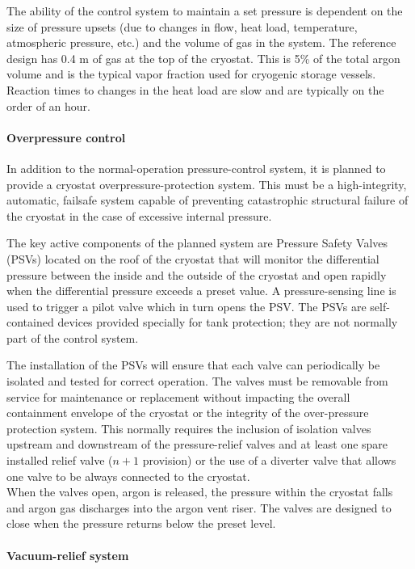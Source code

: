 The ability of the control system to maintain a set pressure is dependent on the size of pressure upsets (due to changes in flow, heat load, temperature, atmospheric pressure, etc.) and the volume of gas in the system. The reference design has 0.4 m of gas at the top of the cryostat. This is 5\% of the total argon volume and is the typical vapor fraction used for cryogenic storage vessels. Reaction times to changes in the heat load are slow and are typically on the order of an hour.

\paragraph{Overpressure control}

In addition to the normal-operation pressure-control system, it is planned to provide a cryostat overpressure-protection system. This must be a high-integrity, automatic, failsafe system capable of preventing catastrophic structural failure of the cryostat in the case of excessive internal pressure.

The key active components of the planned system are Pressure Safety Valves (PSVs) located on the roof of the cryostat that will monitor the differential pressure between the inside and the outside of the cryostat and open rapidly when the differential pressure exceeds a preset value. A pressure-sensing line is used to trigger a pilot valve which in turn opens the PSV. The PSVs are self-contained devices provided specially for tank protection; they are not normally part of the control system. 

The installation of the PSVs will ensure that each valve can periodically be isolated and tested for correct operation. The valves must be removable from service for maintenance or replacement without impacting the overall containment envelope of the cryostat or the integrity of the over-pressure protection system. This normally requires the inclusion of isolation valves upstream and downstream of the pressure-relief valves and at least one spare installed relief valve ($n + 1$ provision) or the use of a diverter valve that allows one valve to be always connected to the cryostat. \\
%
When the valves open, argon is released, the pressure within the cryostat falls and argon gas discharges into the argon vent riser. The valves are designed to close when the pressure returns below the preset level.

\paragraph{Vacuum-relief system}

